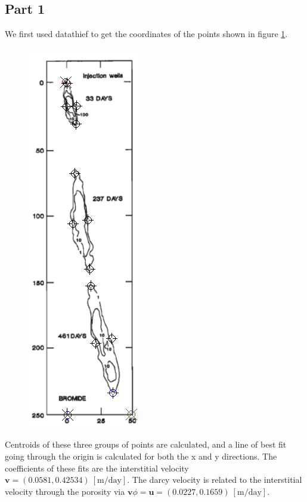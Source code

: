 \documentclass{article}
\begin{document}
\subsection{Part 1}
We first used datathief to get the coordinates of the points shown in figure \ref{fig:datathief}.
\begin{figure}[!h]
\includegraphics[scale=1.0]{dt.png}
\centering
\label{fig:datathief}
\end{figure}

Centroids of these three groups of points are calculated, and a line of best fit going through the origin is calculated for both the x and y directions.
The coefficients of these fits are the interstitial velocity $\mathbf{v} = (0.0581, 0.42534)\ [\mathrm{m} / \mathrm{day}]$.
The darcy velocity is related to the interstitial velocity through the porosity via $\mathbf{v} \phi = \mathbf{u} = (0.0227, 0.1659)\ [\mathrm{m} / \mathrm{day}]$.
\end{document}
